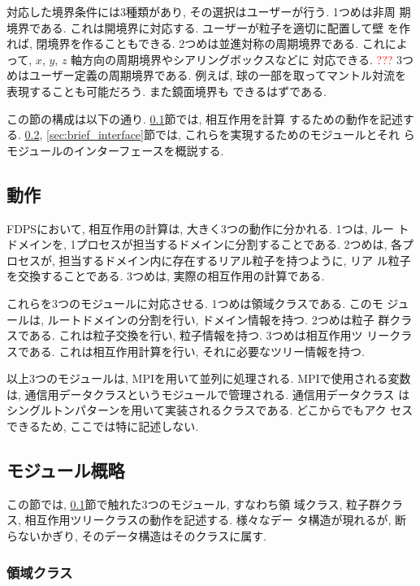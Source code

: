 \documentclass[12pt,a4paper]{jarticle}
\newcommand{\redtext}[1]{\textcolor{red}{#1}}
\begin{document}
対応した境界条件には3種類があり, その選択はユーザーが行う. 1つめは非周
期境界である. これは開境界に対応する. ユーザーが粒子を適切に配置して壁
を作れば, 閉境界を作ることもできる. 2つめは並進対称の周期境界である.
これによって, $x$, $y$, $z$ 軸方向の周期境界やシアリングボックスなどに
対応できる. \redtext{???} 3つめはユーザー定義の周期境界である. 例えば,
球の一部を取ってマントル対流を表現することも可能だろう. また鏡面境界も
できるはずである.

この節の構成は以下の通り. \ref{sec:brief_action}節では, 相互作用を計算
するための動作を記述する. \ref{sec:brief_module},
\ref{sec:brief_interface}節では, これらを実現するためのモジュールとそれ
らモジュールのインターフェースを概説する.

\subsection{動作}
\label{sec:brief_action}

FDPSにおいて, 相互作用の計算は, 大きく3つの動作に分かれる. 1つは, ルー
トドメインを, 1プロセスが担当するドメインに分割することである. 2つめは,
各プロセスが, 担当するドメイン内に存在するリアル粒子を持つように, リア
ル粒子を交換することである. 3つめは, 実際の相互作用の計算である. 

これらを3つのモジュールに対応させる. 1つめは領域クラスである. このモ
ジュールは, ルートドメインの分割を行い, ドメイン情報を持つ. 2つめは粒子
群クラスである. これは粒子交換を行い, 粒子情報を持つ. 3つめは相互作用ツ
リークラスである. これは相互作用計算を行い, それに必要なツリー情報を持つ.

以上3つのモジュールは, MPIを用いて並列に処理される. MPIで使用される変数
は, 通信用データクラスというモジュールで管理される. 通信用データクラス
はシングルトンパターンを用いて実装されるクラスである. どこからでもアク
セスできるため, ここでは特に記述しない.

\subsection{モジュール概略}
\label{sec:brief_module}

この節では, \ref{sec:brief_action}節で触れた3つのモジュール, すなわち領
域クラス, 粒子群クラス, 相互作用ツリークラスの動作を記述する. 様々なデー
タ構造が現れるが, 断らないかぎり, そのデータ構造はそのクラスに属す.

\subsubsection{領域クラス}
\label{sec:brief_module_domain_info}
\end{document}
